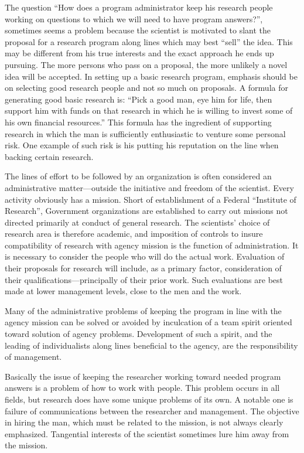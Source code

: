 \documentclass{memoir}
\begin{document}
The question ``How does a program administrator keep his research people working on questions to which we will need to have program answers?'', sometimes seems a problem because the scientist is motivated to slant the proposal for a research program along lines which may best ``sell'' the idea. This may be different from his true interests and the exact approach he ends up pursuing. The more persons who pass on a proposal, the more unlikely a novel idea will be accepted. In setting up a basic research program, emphasis should be on selecting good research people and not so much on proposals. A formula for generating good basic research is: ``Pick a good man, eye him for life, then support him with funds on that research in which he is willing to invest some of his own financial resources.'' This formula has the ingredient of supporting research in which the man is sufficiently enthusiastic to venture some personal risk. One example of such risk is his putting his reputation on the line when backing certain research.

The lines of effort to be followed by an organization is often considered an administrative matter---outside the initiative and freedom of the scientist. Every activity obviously has a mission. Short of establishment of a Federal ``Institute of Research'', Government organizations are established to carry out missions not directed primarily at conduct of general research. The scientists' choice of research area is therefore academic, and imposition of controls to insure compatibility of research with agency mission is the function of administration. It is necessary to consider the people who will do the actual work. Evaluation of their proposals for research will include, as a primary factor, consideration of their qualifications---principally of their prior work. Such evaluations are best made at lower management levels, close to the men and the work.

Many of the administrative problems of keeping the program in line with the agency mission can be solved or avoided by inculcation of a team spirit oriented toward solution of agency problems. Development of such a spirit, and the leading of individualists along lines beneficial to the agency, are the responsibility of management.

Basically the issue of keeping the researcher working toward needed program answers is a problem of how to work with people. This problem occurs in all fields, but research does have some unique problems of its own. A notable one is failure of communications between the researcher and management. The objective in hiring the man, which must be related to the mission, is not always clearly emphasized. Tangential interests of the scientist sometimes lure him away from the mission.
\end{document}
